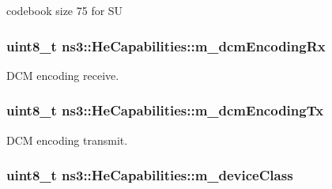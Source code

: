 codebook size 75 for SU 

\subsubsection[{\texorpdfstring{m\+\_\+dcm\+Encoding\+Rx}{m_dcmEncodingRx}}]{\setlength{\rightskip}{0pt plus 5cm}uint8\+\_\+t ns3\+::\+He\+Capabilities\+::m\+\_\+dcm\+Encoding\+Rx\hspace{0.3cm}{\ttfamily [private]}}\hypertarget{classns3_1_1HeCapabilities_afe1da2309e85423e9d7b8ca27ca045c2}{}\label{classns3_1_1HeCapabilities_afe1da2309e85423e9d7b8ca27ca045c2}


D\+CM encoding receive. 

\subsubsection[{\texorpdfstring{m\+\_\+dcm\+Encoding\+Tx}{m_dcmEncodingTx}}]{\setlength{\rightskip}{0pt plus 5cm}uint8\+\_\+t ns3\+::\+He\+Capabilities\+::m\+\_\+dcm\+Encoding\+Tx\hspace{0.3cm}{\ttfamily [private]}}\hypertarget{classns3_1_1HeCapabilities_a7f0d8ca47744f7f0b5ca6eeda52c66e9}{}\label{classns3_1_1HeCapabilities_a7f0d8ca47744f7f0b5ca6eeda52c66e9}


D\+CM encoding transmit. 

\subsubsection[{\texorpdfstring{m\+\_\+device\+Class}{m_deviceClass}}]{\setlength{\rightskip}{0pt plus 5cm}uint8\+\_\+t ns3\+::\+He\+Capabilities\+::m\+\_\+device\+Class\hspace{0.3cm}{\ttfamily [private]}}\hypertarget{classns3_1_1HeCapabilities_aac04f89c46b6cf874ea55f9c8217d778}{}\label{classns3_1_1HeCapabilities_aac04f89c46b6cf874ea55f9c8217d778}


